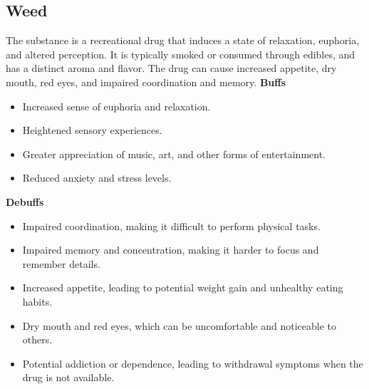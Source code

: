 \documentclass{book}
\begin{document}
\subsection{Weed}
The substance is a recreational drug that induces a state of relaxation, euphoria, and altered perception. It is typically smoked or consumed through edibles, and has a distinct aroma and flavor. The drug can cause increased appetite, dry mouth, red eyes, and impaired coordination and memory.
\textbf{Buffs}
    \begin{itemize}
        \item Increased sense of euphoria and relaxation.
        \item Heightened sensory experiences.
        \item Greater appreciation of music, art, and other forms of entertainment.
        \item Reduced anxiety and stress levels.
    \end{itemize}
\textbf{Debuffs}
    \begin{itemize}
        \item Impaired coordination, making it difficult to perform physical tasks.
        \item Impaired memory and concentration, making it harder to focus and remember details.
        \item Increased appetite, leading to potential weight gain and unhealthy eating habits.
        \item Dry mouth and red eyes, which can be uncomfortable and noticeable to others.
        \item Potential addiction or dependence, leading to withdrawal symptoms when the drug is not available.
    \end{itemize}
\end{document}
